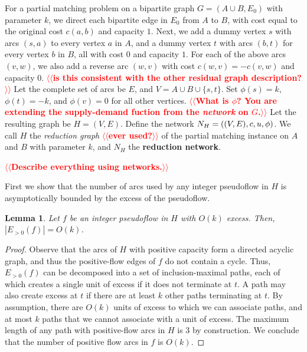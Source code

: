 \documentclass[11pt]{article}
\makeatletter
\def\fsupply{\phi}
\theoremstyle{plain}
\newtheorem{lemma}{Lemma}[section]
\newtheorem{observation}[lemma]{Observation}
\numberwithin{figure}{section}
\def\EMPH#1{\textbf{\boldmath #1}}
\def\n@te#1{\textsf{\boldmath \textbf{$\langle\!\langle$#1$\rangle\!\rangle$}}\leavevmode}
\def\note#1{\textcolor{red}{\n@te{#1}}}
\makeatother
\begin{document}
For a partial matching problem on a bipartite graph $G = (A \cup B, E_0)$ with parameter $k$, we
direct each bipartite edge in $E_0$ from $A$ to $B$, with cost equal to the
original cost $c(a, b)$ and capacity $1$.
Next, we add a dummy vertex $s$ with arcs $(s, a)$ to every vertex $a$ in $A$,
and a dummy vertex $t$ with arcs $(b, t)$ for every vertex $b$ in $B$,
all with cost $0$ and capacity $1$.
For each of the above arcs $(v, w)$, we also add a reverse arc $(w, v)$ with
cost $c(w, v) = -c(v, w)$ and capacity $0$. \note{is this consistent with the other residual graph description?}
Let the complete set of arcs be $E$, and $V = A \cup B \cup \{s, t\}$.
Set $\fsupply(s) = k$, $\fsupply(t) = -k$, and $\fsupply(v) = 0$ for all other
vertices. \note{What is $\phi$?  You are extending the supply-demand fuction from the \emph{network} on $G$.}
Let the resulting graph be $H = (V, E)$.  Define the network
$\EMPH{$N_H$} = ((V, E), c, u, \fsupply)$.
We call $H$ the \emph{reduction graph} \note{ever used?} of the partial matching instance on
$A$ and $B$ with parameter $k$, and $N_H$ the \EMPH{reduction network}.

\note{Describe everything using networks.}


First we show that the number of arcs used by any integer pseudoflow
in $H$ is asymptotically bounded by the excess of the pseudoflow.

\begin{lemma}
\label{lemma:reduction_count}
Let $f$ be an integer pseudoflow in $H$ with $O(k)$ excess.
Then, $|E_{>0}(f)| = O(k)$.
\end{lemma}

\begin{proof}
Observe that the arcs of $H$ with positive capacity form a directed acyclic graph, and thus the positive-flow edges of $f$ do not
contain a cycle.
Thus, $E_{>0}(f)$ can be decomposed into a set of inclusion-maximal paths,
each of which creates a single unit of excess if it does not terminate at $t$.
A path may also create excess at $t$ if there are at least $k$ other paths
terminating at $t$.
By assumption, there are $O(k)$ units of excess to which we can associate
paths, and at most $k$ paths that we cannot associate with a unit of excess.
The maximum length of any path with positive-flow arcs in $H$ is $3$ by
construction.
We conclude that the number of positive flow arcs in $f$ is $O(k)$.
\end{proof}
\end{document}
